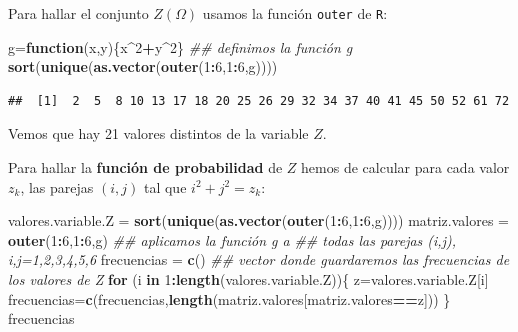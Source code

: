 \documentclass[]{book}
\newenvironment{Shaded}{\begin{snugshade}}{\end{snugshade}}
\newcommand{\CommentTok}[1]{\textcolor[rgb]{0.56,0.35,0.01}{\textit{#1}}}
\newcommand{\ControlFlowTok}[1]{\textcolor[rgb]{0.13,0.29,0.53}{\textbf{#1}}}
\newcommand{\DecValTok}[1]{\textcolor[rgb]{0.00,0.00,0.81}{#1}}
\newcommand{\KeywordTok}[1]{\textcolor[rgb]{0.13,0.29,0.53}{\textbf{#1}}}
\newcommand{\NormalTok}[1]{#1}
\newcommand{\OperatorTok}[1]{\textcolor[rgb]{0.81,0.36,0.00}{\textbf{#1}}}
\newcommand{\StringTok}[1]{\textcolor[rgb]{0.31,0.60,0.02}{#1}}
\begin{document}
Para hallar el conjunto \(Z(\Omega)\) usamos la función \texttt{outer} de \texttt{R}:

\begin{Shaded}
\begin{Highlighting}[]
\NormalTok{g=}\ControlFlowTok{function}\NormalTok{(x,y)\{x}\OperatorTok{^}\DecValTok{2}\OperatorTok{+}\NormalTok{y}\OperatorTok{^}\DecValTok{2}\NormalTok{\}  }\CommentTok{## definimos la función g}
\KeywordTok{sort}\NormalTok{(}\KeywordTok{unique}\NormalTok{(}\KeywordTok{as.vector}\NormalTok{(}\KeywordTok{outer}\NormalTok{(}\DecValTok{1}\OperatorTok{:}\DecValTok{6}\NormalTok{,}\DecValTok{1}\OperatorTok{:}\DecValTok{6}\NormalTok{,g))))}
\end{Highlighting}
\end{Shaded}

\begin{verbatim}
##  [1]  2  5  8 10 13 17 18 20 25 26 29 32 34 37 40 41 45 50 52 61 72
\end{verbatim}

Vemos que hay 21 valores distintos de la variable \(Z\).

Para hallar la \textbf{función de probabilidad} de \(Z\) hemos de calcular para cada valor \(z_k\), las parejas \((i,j)\) tal que \(i^2+j^2=z_k\):

\begin{Shaded}
\begin{Highlighting}[]
\NormalTok{valores.variable.Z =}\StringTok{ }\KeywordTok{sort}\NormalTok{(}\KeywordTok{unique}\NormalTok{(}\KeywordTok{as.vector}\NormalTok{(}\KeywordTok{outer}\NormalTok{(}\DecValTok{1}\OperatorTok{:}\DecValTok{6}\NormalTok{,}\DecValTok{1}\OperatorTok{:}\DecValTok{6}\NormalTok{,g))))  }
\NormalTok{matriz.valores =}\StringTok{ }\KeywordTok{outer}\NormalTok{(}\DecValTok{1}\OperatorTok{:}\DecValTok{6}\NormalTok{,}\DecValTok{1}\OperatorTok{:}\DecValTok{6}\NormalTok{,g) }\CommentTok{## aplicamos la función g a }
\CommentTok{##  todas las parejas (i,j), i,j=1,2,3,4,5,6}
\NormalTok{frecuencias =}\StringTok{ }\KeywordTok{c}\NormalTok{()  }\CommentTok{## vector donde guardaremos las frecuencias de los valores de Z}
\ControlFlowTok{for}\NormalTok{ (i }\ControlFlowTok{in} \DecValTok{1}\OperatorTok{:}\KeywordTok{length}\NormalTok{(valores.variable.Z))\{}
\NormalTok{  z=valores.variable.Z[i]}
\NormalTok{  frecuencias=}\KeywordTok{c}\NormalTok{(frecuencias,}\KeywordTok{length}\NormalTok{(matriz.valores[matriz.valores}\OperatorTok{==}\NormalTok{z]))}
\NormalTok{\}}
\NormalTok{frecuencias}
\end{Highlighting}
\end{Shaded}
\end{document}
